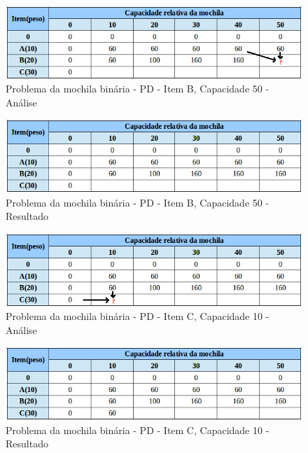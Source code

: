 \FloatBarrier
\begin{figure}[!h]
\centering
\includegraphics[keepaspectratio=true,scale=0.6]{figuras/mochila20_50.png}
\caption{Problema da mochila binária - PD - Item B, Capacidade 50 - Análise}
\label{mochila20_50}
\end{figure}

\FloatBarrier
\begin{figure}[!h]
\centering
\includegraphics[keepaspectratio=true,scale=0.6]{figuras/mochila20_50_resp.png}
\caption{Problema da mochila binária - PD - Item B, Capacidade 50 - Resultado}
\label{mochila20_50_resp}
\end{figure}

\FloatBarrier
\begin{figure}[!h]
\centering
\includegraphics[keepaspectratio=true,scale=0.6]{figuras/mochila30_10.png}
\caption{Problema da mochila binária - PD - Item C, Capacidade 10 - Análise}
\label{mochila30_10}
\end{figure}

\FloatBarrier
\begin{figure}[!h]
\centering
\includegraphics[keepaspectratio=true,scale=0.6]{figuras/mochila30_10_resp.png}
\caption{Problema da mochila binária - PD - Item C, Capacidade 10 - Resultado}
\label{mochila30_10_resp}
\end{figure}

